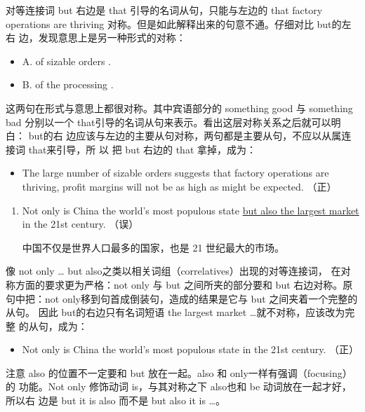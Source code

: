 对等连接词 but 右边是 that 引导的名词从句，只能与左边的 that factory
operations are thriving 对称。但是如此解释出来的句意不通。仔细对比 but的左右
边，发现意思上是另一种形式的对称：
\begin{itemize}
\item A.  of sizable orders  .
\item B.  of the processing  .
\end{itemize}
这两句在形式与意思上都很对称。其中宾语部分的 something good 与 something bad
分别以一个 that引导的名词从句来表示。看出这层对称关系之后就可以明白： but的右
边应该与左边的主要从句对称，两句都是主要从句，不应以从属连接词 that来引导，所
以 把 but 右边的 that 拿掉，成为：
\begin{mybox}
\begin{itemize}
\item The large number of sizable orders suggests that factory operations are
  thriving,  profit
  margins will not be as high as might be expected. （正）
\end{itemize}
\end{mybox}

\begin{enumerate}[resume]
\item Not only is China the world's most populous state \ul{but also the largest
  market} in the 21st century. （误）

  中国不仅是世界人口最多的国家，也是 21 世纪最大的市场。
\end{enumerate}
像 not only \ldots{} but also之类以相关词组（correlatives）出现的对等连接词，
在对称方面的要求更为严格：not only 与 but 之间所夹的部分要和 but 右边对称。原
句中把：not only移到句首成倒装句，造成的结果是它与 but 之间夹着一个完整的从句。
因此 but的右边只有名词短语 the largest market \ldots{}就不对称，应该改为完整
的从句，成为：
\begin{mybox}
\begin{itemize}
\item Not only is China the world's most populous state  in the 21st century. （正）
\end{itemize}
\end{mybox}

注意 also 的位置不一定要和 but 放在一起。also 和 only一样有强调（focusing）的
功能。Not only 修饰动词 is，与其对称之下 also也和 be 动词放在一起才好，所以右
边是 but it is also 而不是 but also it is \ldots。

